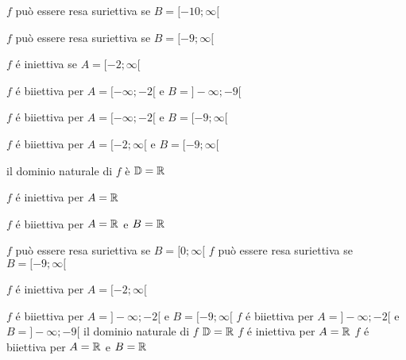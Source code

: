 \begin{questions}
    \question

    \begin{checkboxes}

        \choice $f$ può essere resa suriettiva se $B=[-10;\infty[$

        \CorrectChoice $f$ può essere resa suriettiva se $B=[-9;\infty[$

        \CorrectChoice $f$ é iniettiva se $A=[-2;\infty[$

        \choice $f$ é biiettiva per $A=[-\infty;-2[$ e $B=]-\infty;-9[$

        \CorrectChoice $f$ é biiettiva per $A=[-\infty;-2[$ e $B=[-9;\infty[$

        \CorrectChoice $f$ é biiettiva per $A=[-2;\infty[$ e $B=[-9;\infty[$

        \CorrectChoice il dominio naturale di $f$ è $\mathbb{D}=\mathbb{R}$

        \choice $f$ é iniettiva per $A=\mathbb{R}$

        \choice $f$ é biiettiva per $A=\mathbb{R}$ e $B=\mathbb{R}$

    \end{checkboxes}

    \question

    \begin{checkboxes}

        \CorrectChoice $f$  può essere resa suriettiva se  $B=[0;\infty[$
        \CorrectChoice $f$  può essere resa suriettiva se  $B=[-9;\infty[$

        \CorrectChoice $f$ é iniettiva per $A=[-2;\infty[$

                    \choice $f$ é biiettiva per $A=]-\infty;-2[$ e $B=[-9;\infty[$
                    \CorrectChoice $f$ é biiettiva per $A=]-\infty;-2[$ e $B=]-\infty;-9[$
        \CorrectChoice il dominio naturale di $f$ $\mathbb{D}=\mathbb{R}$
        \CorrectChoice $f$ é iniettiva per $A=\mathbb{R}$
        \CorrectChoice $f$ é biiettiva per $A=\mathbb{R}$ e $B=\mathbb{R}$

    \end{checkboxes}
\end{questions}

